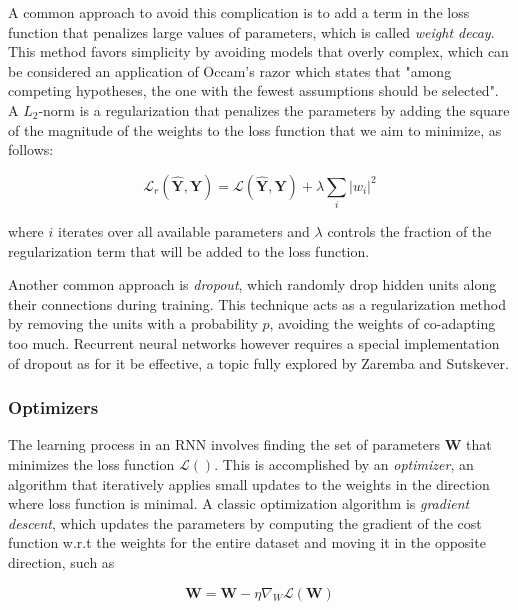 \documentclass{kththesis}
\begin{document}
A common approach to avoid this complication is to add a term in the loss function that penalizes large values of parameters, which is called \emph{weight decay}. This method favors simplicity by avoiding models that overly complex, which can be considered an application of Occam's razor which states that "among competing hypotheses, the one with the fewest assumptions should be selected". A $L_2$-norm is a regularization that penalizes the parameters by adding the square of the magnitude of the weights to the loss function that we aim to minimize\citep{phaisangittisagul2016analysis}, as follows:

\begin{equation}
\mathcal{L}_r(\hat{\mathbf{Y}}, \mathbf{Y}) = \mathcal{L}(\hat{\mathbf{Y}}, \mathbf{Y}) + \lambda \sum_i |w_i|^2
\end{equation}
 
where $i$ iterates over all available parameters and $\lambda$ controls the fraction of the regularization term that will be added to the loss function.

Another common approach is \emph{dropout}\citep{srivastava2014dropout}, which randomly drop hidden units along their connections during training. This technique acts as a regularization method by removing the units with a probability $p$, avoiding the weights of co-adapting too much. Recurrent neural networks however requires a special implementation of dropout as for it be effective, a topic fully explored by Zaremba and Sutskever\citep{zaremba2014recurrent}.

\subsubsection{Optimizers}

The learning process in an RNN involves finding the set of parameters $\mathbf{W}$ that minimizes the loss function $\mathcal{L}()$. This is accomplished by an \emph{optimizer}, an algorithm that iteratively applies small updates to the weights in the direction where loss function is minimal. A classic optimization algorithm is \emph{gradient descent}, which updates the parameters by computing the gradient of the cost function w.r.t the weights for the entire dataset and moving it in the opposite direction, such as

\begin{equation}
\mathbf{W} = \mathbf{W} - \eta \nabla_W \mathcal{L}(\mathbf{W}) 
\end{equation}
\end{document}
